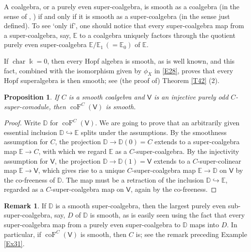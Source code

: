 \documentclass[11pt, a4paper]{amsart}
\newtheorem{prop}[theorem]{Proposition}
\theoremstyle{definition}
\newtheorem{rem}[theorem]{Remark}
\numberwithin{equation}{section}
\begin{document}
A coalgebra, or a purely even super-coalgebra, is smooth as a coalgebra (in the sense of \cite{T0}, \cite{FS}) if and only if it is smooth as a super-coalgebra
(in the sense just defined). To see `only if', one should notice that every super-coalgebra map from a super-coalgebra, say, $\mathbb{E}$ to a coalgebra
uniquely factors through the
quotient purely even super-coalgebra $\mathbb{E}/\mathbb{E}_1\, (=\mathbb{E}_0)$ of $\mathbb{E}$. 

If $\operatorname{char}\Bbbk =0$, then every Hopf algebra is smooth, 
as is well known, and this fact,
combined with the isomorphism given by $\phi_X$ in \eqref{E28}, proves that every Hopf superalgebra is then smooth; see (the proof of) Theorem \ref{T42} (2). 

\begin{prop}\label{P32}
If $C$ is a smooth coalgebra and $\mathsf{V}$ is an injective purely odd $C$-super-comodule, then 
$\operatorname{coF}^C(\mathsf{V})$ is smooth.  
\end{prop}
\begin{proof}
Write $\mathbb{D}$ for $\operatorname{coF}^C(\mathsf{V})$. 
We are going to prove that an arbitrarily given essential inclusion 
$\mathbb{D}\hookrightarrow \mathbb{E}$ splits under the assumptions. 
By the smoothness assumption for $C$, the projection $\mathbb{D}\to \mathbb{D}(0)=C$ extends to a 
super-coalgebra map $\mathbb{E}\to C$, with which we regard $\mathbb{E}$ as a $C$-super-coalgebra. 
By the injectivity assumption for $\mathsf{V}$, the projection $\mathbb{D}\to \mathbb{D}(1)=\mathsf{V}$ extends to a
$C$-super-colinear map $\mathbb{E}\to \mathsf{V}$, which gives rise to a unique 
$C$-super-coalgebra map $\mathbb{E}\to \mathbb{D}$ on $\mathsf{V}$ 
by the co-freeness of $\mathbb{D}$. The map must be a retraction of the inclusion 
$\mathbb{D}\hookrightarrow \mathbb{E}$, regarded as a $C$-super-coalgebra map on $\mathsf{V}$,
again by the co-freeness. 
\end{proof}

\begin{rem}\label{R33}
If $\mathbb{D}$ is a smooth super-coalgebra, then the largest purely even sub-super-coalgebra, say, 
$D$ of $\mathbb{D}$
is smooth, as is easily seen using the fact that every super-coalgebra map from a purely even super-coalgebra to
$\mathbb{D}$ maps into $D$. In particular, if $\operatorname{coF}^C(\mathsf{V})$ is smooth, then $C$ is; see the
remark preceding Example \ref{Ex31}.
\end{rem}
\end{document}
